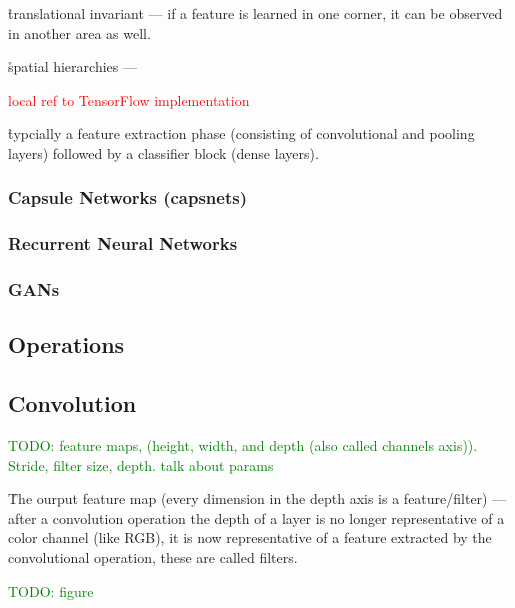 \r{translational invariant --- if a feature is learned in one corner, it can be observed in another area as well.}

\r{spatial hierarchies --- }

\textcolor{red}{local ref to TensorFlow implementation}

\r{typcially a feature extraction phase (consisting of convolutional and pooling layers) followed by a classifier block (dense layers).}

\subsubsection{Capsule Networks (capsnets)}

\subsubsection{Recurrent Neural Networks}

\subsubsection{GANs}


\subsection{Operations}

\subsection{Convolution}

\textcolor{green}{TODO: feature maps, (height, width, and depth (also called channels axis)). Stride, filter size, depth. talk about params}

\r{The ourput feature map (every dimension in the depth axis is a feature/filter) --- after a convolution operation the depth of a layer is no longer representative of a color channel (like RGB), it is now representative of a feature extracted by the convolutional operation, these are called filters.}

\textcolor{green}{TODO: figure}

